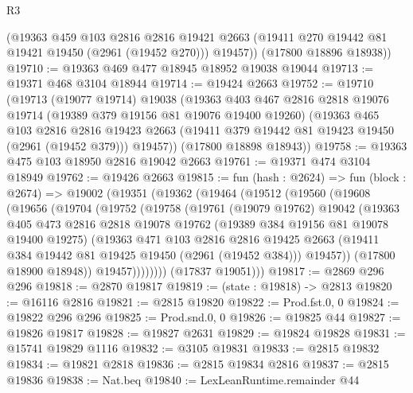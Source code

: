 \begin{lexlean}{R3}
\begin{coremodule}
        (@19363
          @459
          @103
          @2816
          @2816
          @19421
          @2663
          (@19411 @270 @19442 @81 @19421 @19450 (@2961 (@19452 @270)))
          @19457))
      (@17800 @18896 @18938))
@19710 := @19363 @469 @477 @18945 @18952 @19038 @19044
@19713 := @19371 @468 @3104 @18944
@19714 := @19424 @2663
@19752 := @19710
    (@19713
      (@19077 @19714)
      @19038
      (@19363
        @403
        @467
        @2816
        @2818
        @19076
        @19714
        (@19389 @379 @19156 @81 @19076 @19400 @19260)
        (@19363
          @465
          @103
          @2816
          @2816
          @19423
          @2663
          (@19411 @379 @19442 @81 @19423 @19450 (@2961 (@19452 @379)))
          @19457))
      (@17800 @18898 @18943))
@19758 := @19363 @475 @103 @18950 @2816 @19042 @2663
@19761 := @19371 @474 @3104 @18949
@19762 := @19426 @2663
@19815 := fun (hash : @2624) =>
  fun (block : @2674) =>
  @19002
    (@19351
      (@19362
        (@19464
          (@19512
            (@19560
              (@19608
                (@19656
                  (@19704
                    (@19752
                      (@19758
                        (@19761
                          (@19079 @19762)
                          @19042
                          (@19363
                            @405
                            @473
                            @2816
                            @2818
                            @19078
                            @19762
                            (@19389 @384 @19156 @81 @19078 @19400 @19275)
                            (@19363
                              @471
                              @103
                              @2816
                              @2816
                              @19425
                              @2663
                              (@19411 @384 @19442 @81 @19425 @19450 (@2961 (@19452 @384)))
                              @19457))
                          (@17800 @18900 @18948))
                        @19457))))))))
        (@17837 @19051)))
@19817 := @2869 @296 @296
@19818 := @2870 @19817
@19819 := (state : @19818) -> @2813
@19820 := @16116 @2816
@19821 := @2815 @19820
@19822 := Prod.fst.{0, 0}
@19824 := @19822 @296 @296
@19825 := Prod.snd.{0, 0}
@19826 := @19825 @44
@19827 := @19826 @19817
@19828 := @19827 @2631
@19829 := @19824 @19828
@19831 := @15741 @19829 @1116
@19832 := @3105 @19831
@19833 := @2815 @19832
@19834 := @19821 @2818
@19836 := @2815 @19834 @2816
@19837 := @2815 @19836
@19838 := Nat.beq
@19840 := LexLeanRuntime.remainder @44

\end{coremodule}
\end{lexlean}
